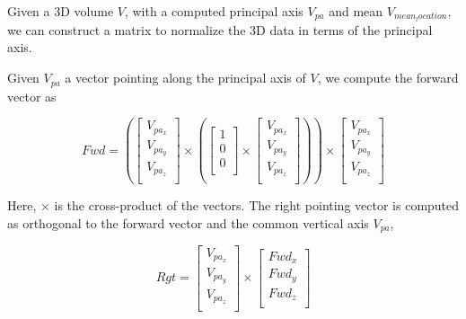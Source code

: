 Given a 3D volume $V$, with a computed principal axis $V_{pa}$ and mean $V_{mean_location}$, we can construct a matrix to normalize the 3D data in terms of the principal axis.

Given $V_{pa}$ a vector pointing along the principal axis of $V$, we compute the forward vector as 


\begin{equation} \label{eqn:fwdVector}
Fwd = \left(\left[
\begin{array}{c}
V_{pa_{x}}\\
V_{pa_{y}}\\
V_{pa_{z}}\\
\end{array}
\right] \times \left(\left[
\begin{array}{c}
1\\
0\\
0\\
\end{array}
\right] \times \left[
\begin{array}{c}
V_{pa_{x}}\\
V_{pa_{y}}\\
V_{pa_{z}}\\
\end{array}
\right]\right)\right) \times \left[
\begin{array}{c}
V_{pa_{x}}\\
V_{pa_{y}}\\
V_{pa_{z}}\\
\end{array}
\right]
\end{equation}

Here, $\times$ is the cross-product of the vectors. The right pointing vector is computed as orthogonal to the forward vector and the common vertical axis $V_{pa}$,


\begin{equation} \label{eqn:fwdVector}
Rgt = \left[
\begin{array}{c}
V_{pa_{x}}\\
V_{pa_{y}}\\
V_{pa_{z}}\\
\end{array}
\right] \times \left[
\begin{array}{c}
Fwd_x\\
Fwd_y\\
Fwd_z\\
\end{array}
\right]
\end{equation}

